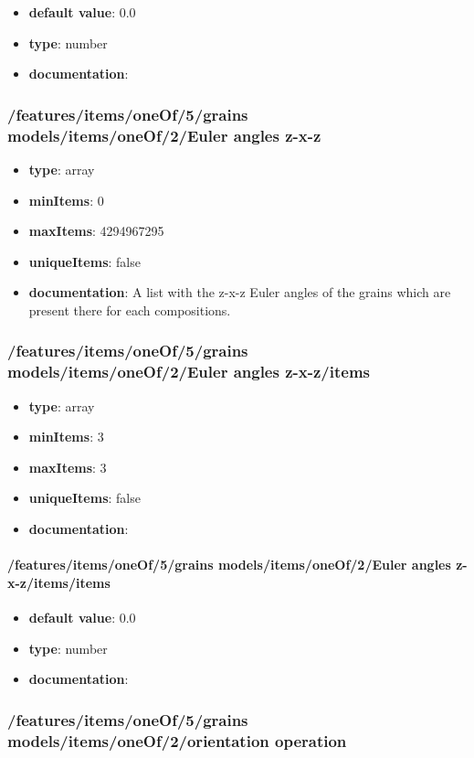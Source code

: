 \begin{itemize}\item {\bf default value}: 0.0
\item {\bf type}: number
\item {\bf documentation}: 
\end{itemize}\subsubsection{/features/items/oneOf/5/grains models/items/oneOf/2/Euler angles z-x-z}
\begin{itemize}\item {\bf type}: array
\item {\bf minItems}: 0
\item {\bf maxItems}: 4294967295
\item {\bf uniqueItems}: false
\item {\bf documentation}: A list with the z-x-z Euler angles of the grains which are present there for each compositions.
\end{itemize}\subsubsection{/features/items/oneOf/5/grains models/items/oneOf/2/Euler angles z-x-z/items}
\begin{itemize}\item {\bf type}: array
\item {\bf minItems}: 3
\item {\bf maxItems}: 3
\item {\bf uniqueItems}: false
\item {\bf documentation}: 
\end{itemize}\paragraph{/features/items/oneOf/5/grains models/items/oneOf/2/Euler angles z-x-z/items/items}
\begin{itemize}\item {\bf default value}: 0.0
\item {\bf type}: number
\item {\bf documentation}: 
\end{itemize}\subsubsection{/features/items/oneOf/5/grains models/items/oneOf/2/orientation operation}
